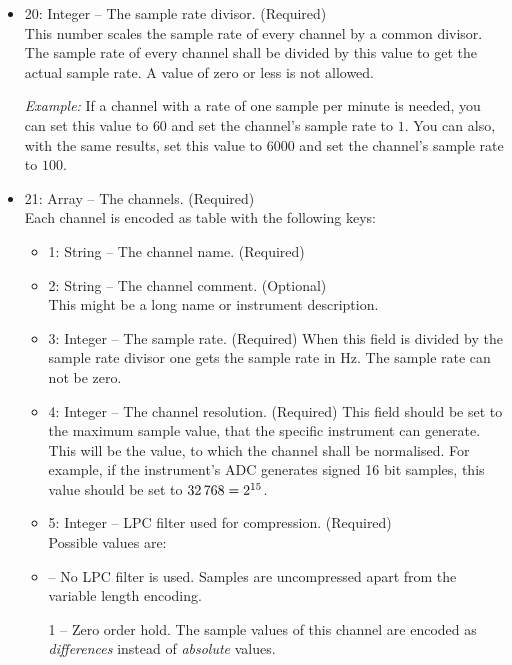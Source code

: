 \documentclass[DIV=10]{scrartcl}
\renewenvironment{quote}
{\list{}{
  \setlength{\rightmargin}{0cm}
  \setlength{\leftmargin}{0.75cm}}%
\item\relax\ignorespaces}
{\unskip\unskip\endlist}
\begin{document}
\begin{itemize}
  \item 20: Integer – The sample rate divisor. (Required)\\
  This number scales the sample rate of every channel by a common divisor.
  The sample rate of every channel shall be divided by this value to get the actual sample rate.
  A value of zero or less is not allowed.

  \emph{Example:} If a channel with a rate of one sample per minute is needed, you can set this value to \(60\) and set the channel’s sample rate to \(1\).
  You can also, with the same results, set this value to \(6000\) and set the channel’s sample rate to \(100\).
  \item 21: Array – The channels. (Required)\\
  Each channel is encoded as table with the following keys:
  \begin{itemize}
    \item 1: String – The channel name. (Required)
    \item 2: String – The channel comment. (Optional)\\
    This might be a long name or instrument description.
    \item 3: Integer – The sample rate. (Required)
    When this field is divided by the sample rate divisor one gets the sample rate in Hz.
    The sample rate can not be zero.
    \item 4: Integer – The channel resolution. (Required)
    This field should be set to the maximum sample value, that the specific instrument can generate.
    This will be the value, to which the channel shall be normalised.
    For example, if the instrument’s ADC generates signed 16 bit samples, this value should be set to \(32\text{\,}768 = 2^{15}\).
    \item 5: Integer – LPC filter used for compression. (Required)\\
    Possible values are:
    \begin{quote}
      0 – No LPC filter is used.
      Samples are uncompressed apart from the variable length encoding.

      1 – Zero order hold.
      The sample values of this channel are encoded as \emph{differences} instead of \emph{absolute} values.


\end{quote}
\end{itemize}
\end{itemize}
\end{document}

